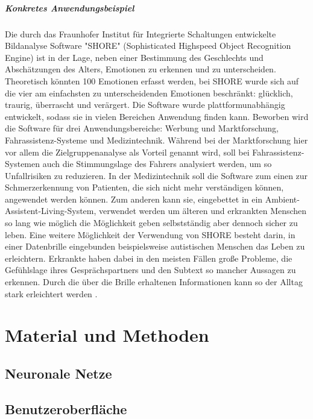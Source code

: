 \documentclass[12pt,a4paper,headinclude,twoside, plainheadsepline, open=right,numbers=noenddot]{scrreprt}
\begin{document}
\paragraph{Konkretes Anwendungsbeispiel}
Die durch das Fraunhofer Institut für Integrierte Schaltungen entwickelte Bildanalyse Software "{}SHORE"{}  (Sophisticated Highspeed Object Recognition Engine)  ist in der Lage, neben einer Bestimmung des Geschlechts und Abschätzungen des Alters, Emotionen zu erkennen und zu unterscheiden. Theoretisch könnten 100 Emotionen erfasst werden, bei SHORE wurde sich auf die vier am einfachsten zu unterscheidenden Emotionen beschränkt: glücklich, traurig, überrascht und verärgert. Die Software wurde plattformunabhängig entwickelt, sodass sie in vielen Bereichen Anwendung finden kann. Beworben wird die Software für drei Anwendungsbereiche: Werbung und Marktforschung, Fahrassistenz-Systeme und Medizintechnik. Während bei der Marktforschung hier vor allem die Zielgruppenanalyse als Vorteil genannt wird, soll bei Fahrassistenz-Systemen auch die Stimmungslage des Fahrers analysiert werden, um so Unfallrisiken zu reduzieren. In der Medizintechnik soll die Software zum einen zur Schmerzerkennung von Patienten, die sich nicht mehr verständigen können, angewendet werden können. Zum anderen kann sie, eingebettet in ein Ambient-Assistent-Living-System, verwendet werden um älteren und erkrankten Menschen so lang wie möglich die Möglichkeit geben selbstständig aber dennoch sicher zu leben.
Eine weitere Möglichkeit der Verwendung von SHORE besteht darin, in einer Datenbrille eingebunden beispielsweise autistischen Menschen das Leben zu erleichtern. Erkrankte haben dabei in den meisten Fällen große Probleme, die Gefühlslage ihres Gesprächspartners und den Subtext so mancher Aussagen zu erkennen. Durch die über die Brille erhaltenen Informationen kann so der Alltag stark erleichtert werden\cite{Ruf2011} \cite{SHORE}. 

\chapter{Material und Methoden}
\section{Neuronale Netze}

\section{Benutzeroberfläche}
\end{document}
